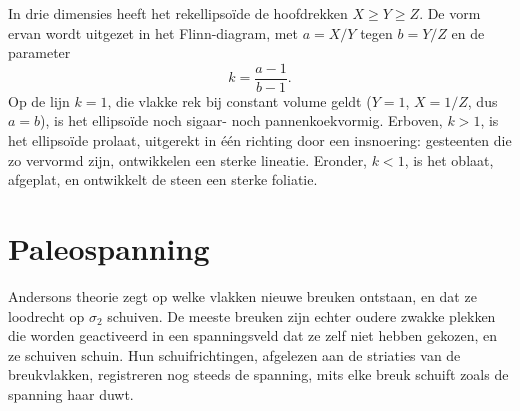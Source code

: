 In drie dimensies heeft het rekellipsoïde de hoofdrekken $X \ge Y
\ge Z$. De vorm ervan wordt uitgezet in het Flinn-diagram, met $a = X/Y$ tegen $b =
Y/Z$ en de parameter
\[
  k = \frac{a - 1}{b - 1} .
\]
Op de lijn $k = 1$, die vlakke rek bij constant volume geldt ($Y = 1$,
$X = 1/Z$, dus $a = b$), is het ellipsoïde noch sigaar- noch pannenkoekvormig. Erboven,
$k > 1$, is het ellipsoïde prolaat, uitgerekt in één richting door een insnoering: gesteenten die zo
vervormd zijn, ontwikkelen een sterke lineatie. Eronder, $k < 1$,
is het oblaat, afgeplat, en ontwikkelt de steen een sterke foliatie.

\begin{omfigure}

\par{}\label{fig:b3:structural-analysis:flinn}
\end{omfigure}

\section{Paleospanning}\label{sec:b3:structural-analysis:palaeostress}

Andersons theorie zegt op welke vlakken nieuwe breuken ontstaan, en dat ze
loodrecht op $\sigma_2$ schuiven. De meeste breuken zijn echter oudere zwakke plekken
die worden geactiveerd in een spanningsveld dat ze zelf niet hebben gekozen, en ze schuiven
schuin. Hun schuifrichtingen, afgelezen aan de striaties van de breukvlakken,
registreren nog steeds de spanning, mits elke breuk schuift zoals de spanning
haar duwt.

